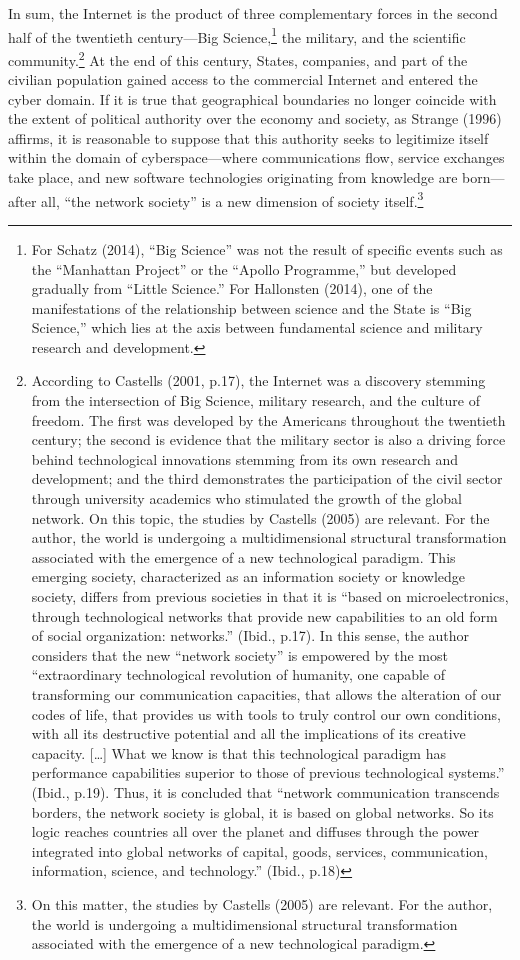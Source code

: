 In sum, the Internet is the product of three complementary forces in the second half of the twentieth century---Big Science,\footnote{For Schatz (2014), ``Big Science'' was not the result of specific events such as the ``Manhattan Project'' or the ``Apollo Programme,'' but developed gradually from ``Little Science.'' For Hallonsten (2014), one of the manifestations of the relationship between science and the State is ``Big Science,'' which lies at the axis between fundamental science and military research and development.} the military, and the scientific community.\footnote{According to Castells (2001, p.17), the Internet was a discovery stemming from the intersection of Big Science, military research, and the culture of freedom. The first was developed by the Americans throughout the twentieth century; the second is evidence that the military sector is also a driving force behind technological innovations stemming from its own research and development; and the third demonstrates the participation of the civil sector through university academics who stimulated the growth of the global network. On this topic, the studies by Castells (2005) are relevant. For the author, the world is undergoing a multidimensional structural transformation associated with the emergence of a new technological paradigm. This emerging society, characterized as an information society or knowledge society, differs from previous societies in that it is ``based on microelectronics, through technological networks that provide new capabilities to an old form of social organization: networks.'' (Ibid., p.17). In this sense, the author considers that the new ``network society'' is empowered by the most ``extraordinary technological revolution of humanity, one capable of transforming our communication capacities, that allows the alteration of our codes of life, that provides us with tools to truly control our own conditions, with all its destructive potential and all the implications of its creative capacity. {[}\ldots{]} What we know is that this technological paradigm has performance capabilities superior to those of previous technological systems.'' (Ibid., p.19). Thus, it is concluded that ``network communication transcends borders, the network society is global, it is based on global networks. So its logic reaches countries all over the planet and diffuses through the power integrated into global networks of capital, goods, services, communication, information, science, and technology.'' (Ibid., p.18)} At the end of this century, States, companies, and part of the civilian population gained access to the commercial Internet and entered the cyber domain. If it is true that geographical boundaries no longer coincide with the extent of political authority over the economy and society, as Strange (1996) affirms, it is reasonable to suppose that this authority seeks to legitimize itself within the domain of cyberspace---where communications flow, service exchanges take place, and new software technologies originating from knowledge are born---after all, ``the network society'' is a new dimension of society itself.\footnote{On this matter, the studies by Castells (2005) are relevant. For the author, the world is undergoing a multidimensional structural transformation associated with the emergence of a new technological paradigm.}

